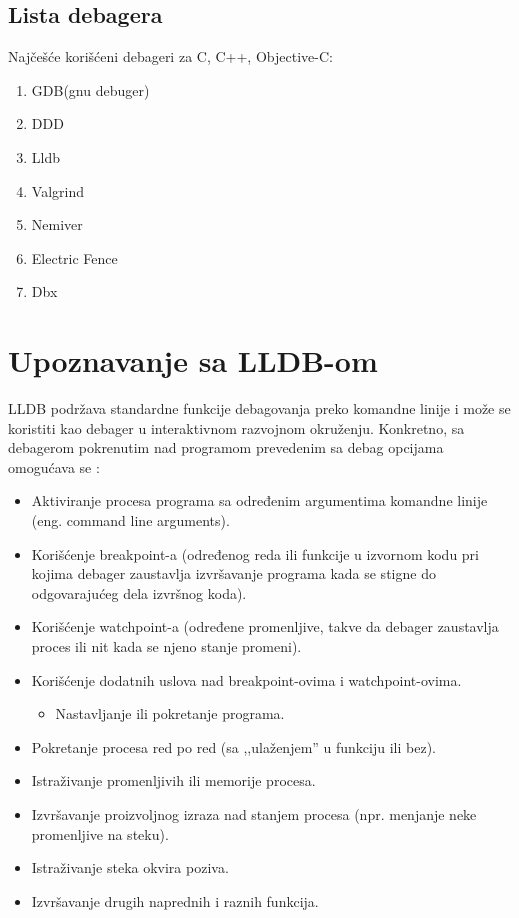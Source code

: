\documentclass[a4paper]{article}
\begin{document}
\subsection{Lista debagera}
\label{sec:Lista debagera}

Najčešće korišćeni debageri za  C, C++, Objective-C\cite{ll_best_debuggers}\cite{up_best_debuggers}:
\begin{enumerate}
	\item GDB(gnu debuger)
	\item DDD 
	\item Lldb
	\item Valgrind
	\item Nemiver
	\item Electric Fence
	\item Dbx
\end{enumerate}

\section{Upoznavanje sa LLDB-om}
LLDB podržava standardne funkcije debagovanja preko komandne linije i može se
koristiti kao debager u interaktivnom razvojnom okruženju. Konkretno, sa
debagerom pokrenutim nad programom prevedenim sa debag opcijama omogućava
se \cite{lldb_to_gdb_map}:

\begin{itemize}
	\item{Aktiviranje procesa programa sa određenim argumentima komandne linije
		(eng. command line arguments).}
	
	\item{Korišćenje breakpoint-a (određenog reda ili funkcije u izvornom kodu pri
		kojima debager zaustavlja izvršavanje programa kada se stigne do odgovarajućeg
		dela izvršnog koda).}
	
	\item{Korišćenje watchpoint-a (određene promenljive, takve da debager zaustavlja
		proces ili nit kada se njeno stanje promeni).}
	
	\item{Korišćenje dodatnih uslova nad breakpoint-ovima i watchpoint-ovima.}
	\begin{itemize}
		\item{Nastavljanje ili pokretanje programa.}
	\end{itemize}
	
	\item{Pokretanje procesa red po red (sa ,,ulaženjem'' u funkciju ili bez).}
	
	\item{Istraživanje promenljivih ili memorije procesa.}
	
	\item{Izvršavanje proizvoljnog izraza nad stanjem procesa (npr. menjanje neke
		promenljive na steku).}
	
	\item{Istraživanje steka okvira poziva.}
	
	\item{Izvršavanje drugih naprednih i raznih funkcija.}
\end{itemize}
\end{document}
